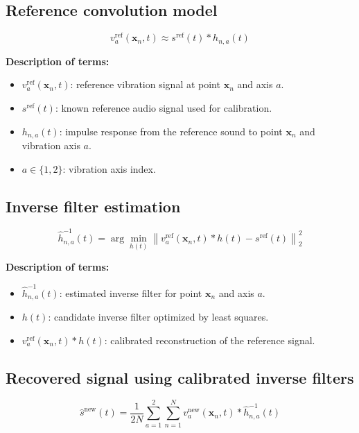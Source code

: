 \documentclass[11pt]{article}
\begin{document}
\subsection{Reference convolution model}

\begin{equation}
v_a^{\mathrm{ref}}(\bm{x}_n,t)
\approx
s^{\mathrm{ref}}(t)
*
h_{n,a}(t)
\end{equation}

\textbf{Description of terms:}

\begin{itemize}
    \item $v_a^{\mathrm{ref}}(\bm{x}_n,t)$: reference vibration signal at point $\bm{x}_n$ and axis $a$.
    \item $s^{\mathrm{ref}}(t)$: known reference audio signal used for calibration.
    \item $h_{n,a}(t)$: impulse response from the reference sound to point $\bm{x}_n$ and vibration axis $a$.
    \item $a \in \{1,2\}$: vibration axis index.
\end{itemize}

\subsection{Inverse filter estimation}

\begin{equation}
\hat{h}_{n,a}^{-1}(t)
=
\arg\min_{h(t)}
\left\|
v_a^{\mathrm{ref}}(\bm{x}_n,t)
*
h(t)
-
s^{\mathrm{ref}}(t)
\right\|_2^2
\end{equation}

\textbf{Description of terms:}

\begin{itemize}
    \item $\hat{h}_{n,a}^{-1}(t)$: estimated inverse filter for point $\bm{x}_n$ and axis $a$.
    \item $h(t)$: candidate inverse filter optimized by least squares.
    \item $v_a^{\mathrm{ref}}(\bm{x}_n,t) * h(t)$: calibrated reconstruction of the reference signal.
\end{itemize}

\subsection{Recovered signal using calibrated inverse filters}

\begin{equation}
\hat{s}^{\mathrm{new}}(t)
=
\frac{1}{2N}
\sum_{a=1}^{2}
\sum_{n=1}^{N}
v_a^{\mathrm{new}}(\bm{x}_n,t)
*
\hat{h}_{n,a}^{-1}(t)
\end{equation}
\end{document}
